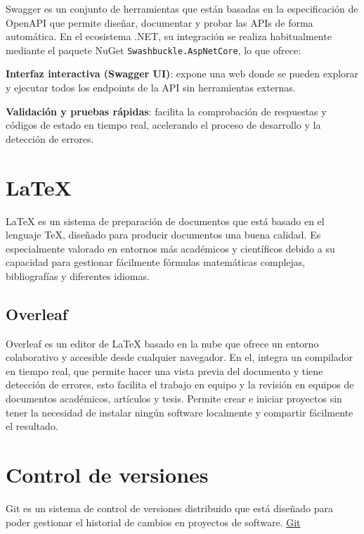 Swagger es un conjunto de herramientas que están basadas en la especificación de OpenAPI que permite diseñar, documentar y probar las APIs de forma automática. En el ecosistema .NET, su integración se realiza habitualmente mediante el paquete NuGet \texttt{Swashbuckle.AspNetCore}, lo que ofrece:

\textbf{Interfaz interactiva (Swagger UI)}: expone una web donde se pueden explorar y ejecutar todos los endpoints de la API sin herramientas externas.

\textbf{Validación y pruebas rápidas}: facilita la comprobación de respuestas y códigos de estado en tiempo real, acelerando el proceso de desarrollo y la detección de errores.


\section{LaTeX}

LaTeX es un sistema de preparación de documentos que está basado en el lenguaje TeX, diseñado para producir documentos una buena calidad. Es especialmente valorado en entornos más académicos y científicos debido a su capacidad para gestionar fácilmente fórmulas matemáticas complejas, bibliografías y diferentes idiomas.


\subsection{Overleaf}

Overleaf es un editor de LaTeX basado en la nube que ofrece un entorno colaborativo y accesible desde cualquier navegador. En el, integra un compilador en tiempo real, que permite hacer una vista previa del documento y tiene detección de errores, esto facilita el trabajo en equipo y la revisión en equipos de documentos académicos, artículos y tesis. Permite crear e iniciar proyectos sin tener la necesidad de instalar ningún software localmente y compartir fácilmente el resultado.


\section{Control de versiones}\label{control-versiones}
Git es un sistema de control de versiones distribuido que está diseñado para poder gestionar el historial de cambios en proyectos de software.
\href{https://git-scm.com/}{Git}

